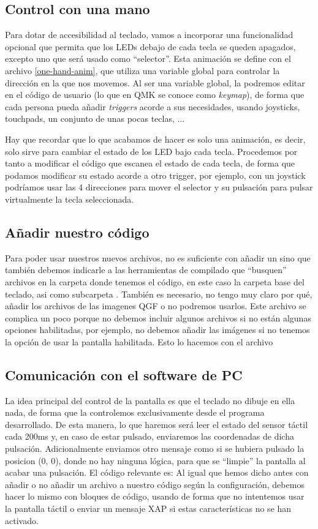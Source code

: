 \subsection{Control con una mano}
Para dotar de accesibilidad al teclado, vamos a incorporar una funcionalidad opcional que permita que los LEDs debajo de cada tecla se queden apagados, excepto uno que será usado como ``selector''. Esta animación se define con el archivo \ref{one-hand-anim}, que utiliza una variable global para controlar la dirección en la que nos movemos. Al ser una variable global, la podremos editar en el código de usuario (lo que en QMK se conoce como \textit{keymap}), de forma que cada persona pueda añadir \textit{triggers} acorde a sus necesidades, usando joysticks, touchpads, un conjunto de unas pocas teclas, ... \par
Hay que recordar que lo que acabamos de hacer es solo una animación, es decir, solo sirve para cambiar el estado de los LED bajo cada tecla. Procedemos por tanto a modificar el código que escanea el estado de cada tecla, de forma que podamos modificar su estado acorde a otro trigger, por ejemplo, con un joystick podríamos usar las 4 direcciones para mover el selector y su pulsación para pulsar virtualmente la tecla seleccionada.

\subsection{Añadir nuestro código}
Para poder usar nuestros nuevos archivos, no es suficiente con añadir un  sino que también debemos indicarle a las herramientas de compilado que ``busquen'' archivos en la carpeta donde tenemos el código, en este caso la carpeta base del teclado, asi como subcarpeta . También es necesario, no tengo muy claro por qué, añadir los archivos  de las imagenes QGF o no podremos usarlos. Este archivo se complica un poco porque no debemos incluir algunos archivos si no están algunas opciones habilitadas, por ejemplo, no debemos añadir las imágenes si no tenemos la opción de usar la pantalla habilitada. Esto lo hacemos con el archivo \cite{rules-mk}

\subsection{Comunicación con el software de PC}
La idea principal del control de la pantalla es que el teclado no dibuje en ella nada, de forma que la controlemos exclusivamente desde el programa desarrollado. De esta manera, lo que haremos será leer el estado del sensor táctil cada 200ms y, en caso de estar pulsado, enviaremos las coordenadas de dicha pulsación. Adicionalmente enviamos otro mensaje como si se hubiera pulsado la posicion (0, 0), donde no hay ninguna lógica, para que se ``limpie'' la pantalla al acabar una pulsación. El código relevante es: 
Al igual que hemos dicho antes con añadir o no añadir un archivo a nuestro código según la configuración, debemos hacer lo mismo con bloques de código, usando  de forma que no intentemos usar la pantalla táctil o enviar un mensaje XAP si estas características no se han activado.
